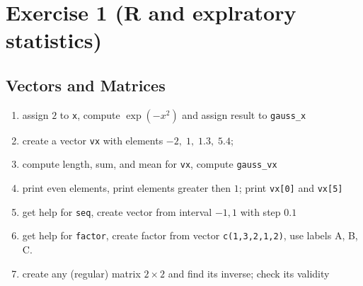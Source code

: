 \documentclass[4pt]{article}
\begin{document}
\section{Exercise 1 (R and explratory statistics)}
%
%
% 

\subsection{Vectors and Matrices}

\begin{enumerate}
 \item assign $2$ to \verb'x', compute $\exp(-x^2)$ and assign result to \verb'gauss_x'
 \item create a vector \verb'vx' with elements $-2,\;1,\;1.3,\;5.4$;
 \item compute length, sum, and mean for \verb'vx', compute \verb'gauss_vx'
 \item print even elements, print elements greater then $1$; print \verb'vx[0]' and \verb'vx[5]'
 \item get help for \verb'seq', create vector from interval $-1,1$ with step $0.1$
 \item get help for \verb'factor', create factor from vector \verb'c(1,3,2,1,2)', use labels A, B, C.
 \item create any (regular) matrix $2\times 2$ and find its inverse; check its validity
\end{enumerate}
\end{document}
